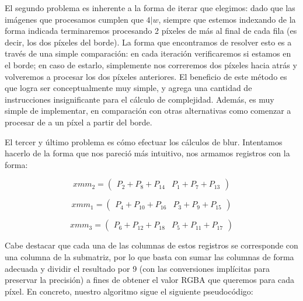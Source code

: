 El segundo problema es inherente a la forma de iterar que elegimos: dado que las imágenes que procesamos cumplen que $4 | w$, siempre que estemos indexando de la forma indicada terminaremos procesando 2 píxeles de más al final de cada fila (es decir, los dos píxeles del borde). La forma que encontramos de resolver esto es a través de una simple comparación: en cada iteración verificaremos si estamos en el borde; en caso de estarlo, simplemente nos correremos dos píxeles hacia atrás y volveremos a procesar los dos píxeles anteriores. El beneficio de este método es que logra ser conceptualmente muy simple, y agrega una cantidad de instrucciones insignificante para el cálculo de complejidad. Además, es muy simple de implementar, en comparación con otras alternativas como comenzar a procesar de a un píxel a partir del borde.

El tercer y último problema es cómo efectuar los cálculos de blur. Intentamos hacerlo de la forma que nos pareció más intuitivo, nos armamos registros con la forma:

$$xmm_2 = \begin{pmatrix} P_2 + P_8 + P_{14} & P_1 + P_7 + P_{13} \end{pmatrix}$$

$$xmm_1 = \begin{pmatrix} P_4 + P_{10} + P_{16} & P_3 + P_9 + P_{15}\end{pmatrix}$$

$$xmm_3 = \begin{pmatrix} P_6 + P_{12} + P_{18} & P_5 + P_{11} + P_{17}\end{pmatrix}$$

Cabe destacar que cada una de las columnas de estos registros se corresponde con una columna de la submatriz, por lo que basta con sumar las columnas de forma adecuada y dividir el resultado por 9 (con las conversiones implícitas para preservar la precisión) a fines de obtener el valor RGBA que queremos para cada píxel. En concreto, nuestro algoritmo sigue el siguiente pseudocódigo:


